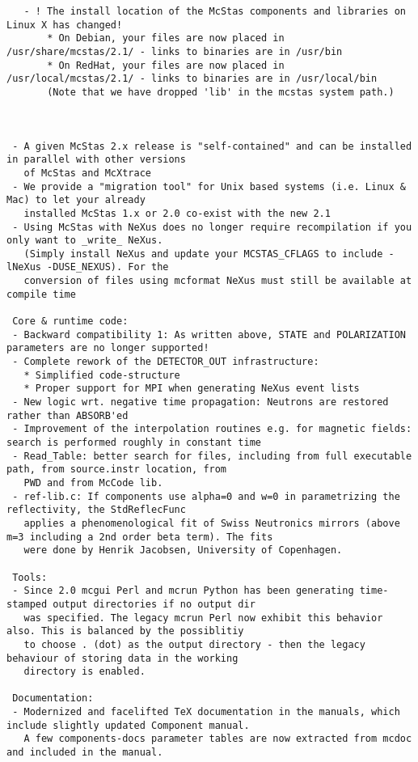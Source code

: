 \begin{lstlisting}
   - ! The install location of the McStas components and libraries on Linux X has changed! 
       * On Debian, your files are now placed in /usr/share/mcstas/2.1/ - links to binaries are in /usr/bin
       * On RedHat, your files are now placed in /usr/local/mcstas/2.1/ - links to binaries are in /usr/local/bin
       (Note that we have dropped 'lib' in the mcstas system path.)


  
 - A given McStas 2.x release is "self-contained" and can be installed in parallel with other versions
   of McStas and McXtrace 
 - We provide a "migration tool" for Unix based systems (i.e. Linux & Mac) to let your already
   installed McStas 1.x or 2.0 co-exist with the new 2.1
 - Using McStas with NeXus does no longer require recompilation if you only want to _write_ NeXus.
   (Simply install NeXus and update your MCSTAS_CFLAGS to include -lNeXus -DUSE_NEXUS). For the
   conversion of files using mcformat NeXus must still be available at compile time

 Core & runtime code:
 - Backward compatibility 1: As written above, STATE and POLARIZATION parameters are no longer supported!
 - Complete rework of the DETECTOR_OUT infrastructure:
   * Simplified code-structure
   * Proper support for MPI when generating NeXus event lists
 - New logic wrt. negative time propagation: Neutrons are restored rather than ABSORB'ed
 - Improvement of the interpolation routines e.g. for magnetic fields: search is performed roughly in constant time
 - Read_Table: better search for files, including from full executable path, from source.instr location, from 
   PWD and from McCode lib.
 - ref-lib.c: If components use alpha=0 and w=0 in parametrizing the reflectivity, the StdReflecFunc
   applies a phenomenological fit of Swiss Neutronics mirrors (above m=3 including a 2nd order beta term). The fits
   were done by Henrik Jacobsen, University of Copenhagen.

 Tools:
 - Since 2.0 mcgui Perl and mcrun Python has been generating time-stamped output directories if no output dir 
   was specified. The legacy mcrun Perl now exhibit this behavior also. This is balanced by the possiblitiy
   to choose . (dot) as the output directory - then the legacy behaviour of storing data in the working
   directory is enabled.

 Documentation:
 - Modernized and facelifted TeX documentation in the manuals, which include slightly updated Component manual.
   A few components-docs parameter tables are now extracted from mcdoc and included in the manual. 


\end{lstlisting}
